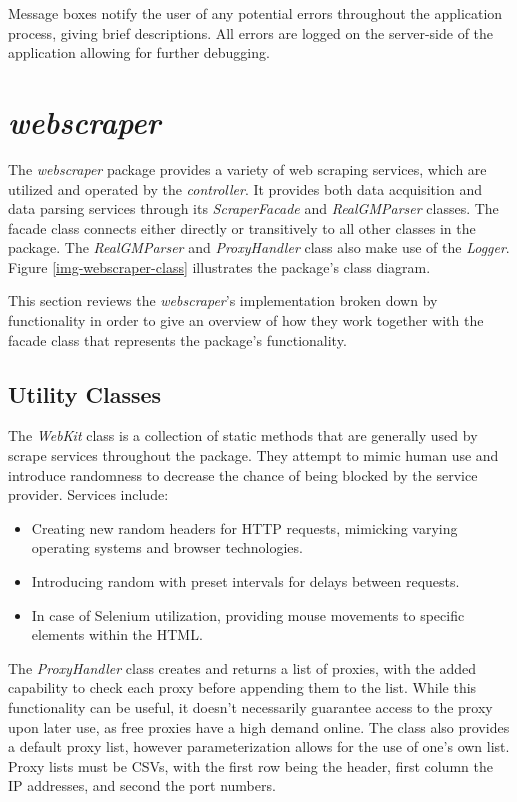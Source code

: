 \documentclass{thesis-ekf}
\theoremstyle{definition}
\theoremstyle{remark}
\begin{document}
Message boxes notify the user of any potential errors throughout the application process, giving brief descriptions. All errors are logged on the server-side of the application allowing for further debugging.


\section{\emph{webscraper}} \label{sec-webscraper}
The \emph{webscraper} package provides a variety of web scraping services, which are utilized and operated by the \emph{controller}. It provides both data acquisition and data parsing services through its \emph{ScraperFacade} and \emph{RealGMParser} classes. The facade class connects either directly or transitively to all other classes in the package. The \emph{RealGMParser} and \emph{ProxyHandler} class also make use of the \emph{Logger}. Figure \ref{img-webscraper-class} illustrates the package's class diagram.

This section reviews the \emph{webscraper}'s implementation broken down by functionality in order to give an overview of how they work together with the facade class that represents the package's functionality.

\subsection{Utility Classes}
The \emph{WebKit} class is a collection of static methods that are generally used by scrape services throughout the package. They attempt to mimic human use and introduce randomness to decrease the chance of being blocked by the service provider. Services include:
\begin{itemize}
	\item Creating new random headers for HTTP requests, mimicking varying operating systems and browser technologies.
	
	\item Introducing random with preset intervals for delays between requests.
	
	\item In case of Selenium utilization, providing mouse movements to specific elements within the HTML.
\end{itemize}

The \emph{ProxyHandler} class creates and returns a list of proxies, with the added capability to check each proxy before appending them to the list. While this functionality can be useful, it doesn't necessarily guarantee access to the proxy upon later use, as free proxies have a high demand online. The class also provides a default proxy list, however parameterization allows for the use of one's own list. Proxy lists must be CSVs, with the first row being the header, first column the IP addresses, and second the port numbers.
\end{document}
